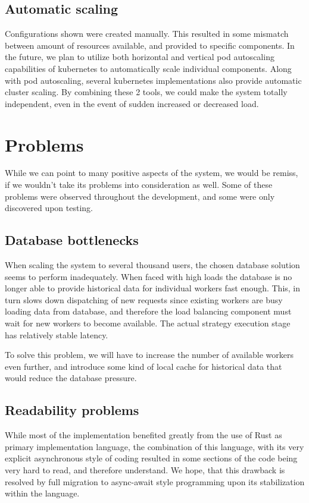 \subsection{Automatic scaling}
Configurations shown were created manually. This resulted in some mismatch between amount of resources available, and provided
to specific components. In the future, we plan to utilize both horizontal and vertical pod autoscaling capabilities of kubernetes
to automatically scale individual components. Along with pod autoscaling, several kubernetes implementations also provide
automatic cluster scaling. By combining these 2 tools, we could make the system totally independent, even in the event
of sudden increased or decreased load.


\section{Problems}
While we can point to many positive aspects of the system, we would be remiss, if we wouldn't take its problems
into consideration as well. Some of these problems were observed throughout the development, and some were only discovered
upon testing.

\subsection{Database bottlenecks}
When scaling the system to several thousand users, the chosen database solution seems to perform inadequately.
When faced with high loads the database is no longer able to provide historical data for individual workers fast enough.
This, in turn slows down dispatching of new requests since existing workers are busy loading data from database, and therefore the
load balancing component must wait for new workers to become available. The actual strategy execution stage has relatively
stable latency.

To solve this problem, we will have to increase the number of available workers even further, and introduce some kind of
local cache for historical data that would reduce the database pressure.

\subsection{Readability problems}
While most of the implementation benefited greatly from the use of Rust as primary implementation language, the combination
of this language, with its very explicit asynchronous style of coding resulted in some sections of the code being
very hard to read, and therefore understand. We hope, that this drawback is resolved by full migration
to async-await style programming upon its stabilization within the language.

